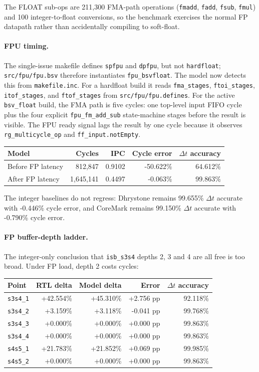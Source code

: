 \documentclass[10pt]{article}
\begin{document}
The FLOAT sub-ops are 211,300 FMA-path operations
(\texttt{fmadd}, \texttt{fadd}, \texttt{fsub}, \texttt{fmul}) and 100
integer-to-float conversions, so the benchmark exercises the normal FP datapath
rather than accidentally compiling to soft-float.

\paragraph{FPU timing.}
The single-issue makefile defines \texttt{spfpu} and \texttt{dpfpu}, but not
\texttt{hardfloat}; \texttt{src/fpu/fpu.bsv} therefore instantiates
\texttt{fpu\_bsvfloat}. The model now detects this from \texttt{makefile.inc}.
For a hardfloat build it reads \texttt{fma\_stages}, \texttt{ftoi\_stages},
\texttt{itof\_stages}, and \texttt{ftof\_stages} from
\texttt{src/fpu/fpu.defines}. For the active \texttt{bsv\_float} build, the FMA
path is five cycles: one top-level input FIFO cycle plus the four explicit
\texttt{fpu\_fm\_add\_sub} state-machine stages before the result is visible.
The FPU ready signal lags the result by one cycle because it observes
\texttt{rg\_multicycle\_op} and \texttt{ff\_input.notEmpty}.

\begin{tabular}{@{}lrrrr@{}}
\toprule
Model & Cycles & IPC & Cycle error & $\Delta t$ accuracy \\
\midrule
Before FP latency & 812,847 & 0.9102 & -50.622\% & 64.612\% \\
After FP latency & 1,645,141 & 0.4497 & -0.063\% & 99.863\% \\
\bottomrule
\end{tabular}

The integer baselines do not regress: Dhrystone remains 99.655\% $\Delta t$
accurate with -0.446\% cycle error, and CoreMark remains 99.150\% $\Delta t$
accurate with -0.790\% cycle error.

\paragraph{FP buffer-depth ladder.}
The integer-only conclusion that \texttt{isb\_s3s4} depths 2, 3 and 4 are all
free is too broad. Under FP load, depth 2 costs cycles:

\begin{tabular}{@{}lrrrr@{}}
\toprule
Point & RTL delta & Model delta & Error & $\Delta t$ accuracy \\
\midrule
\texttt{s3s4\_1} & +42.554\% & +45.310\% & +2.756 pp & 92.118\% \\
\texttt{s3s4\_2} & +3.159\% & +3.118\% & -0.041 pp & 99.768\% \\
\texttt{s3s4\_3} & +0.000\% & +0.000\% & +0.000 pp & 99.863\% \\
\texttt{s3s4\_4} & +0.000\% & +0.000\% & +0.000 pp & 99.863\% \\
\texttt{s4s5\_1} & +21.783\% & +21.852\% & +0.069 pp & 99.985\% \\
\texttt{s4s5\_2} & +0.000\% & +0.000\% & +0.000 pp & 99.863\% \\
\bottomrule
\end{tabular}
\end{document}
